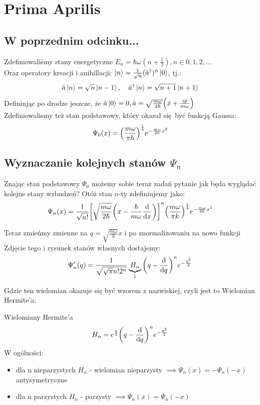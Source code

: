 \documentclass[12pt,a4paper]{report}
\newcommand{\subind}[2]{{\color{blue} #1\index{#2}}}
\newcommand{\com}[1]{{\color{red} #1}}
\newcommand{\phat}{\hat{p}}
\newenvironment{lecture}[1]{\par\medskip
   \noindent\chapter{#1} \rmfamily}{\medskip}
\newenvironment{emph_box}[1]
    {\begin{center}\color{BrickRed}
    \begin{tabular}{|p{0.9\textwidth}|}
    \hline
    \begin{center} \color{Dandelion}{\textbf{#1}} \end{center}
    \begin{center}
    }
    {
    \end{center}
    \\\\\hline
    \end{tabular} 
    \end{center}
    \color{black}
    }
\begin{document}
\begin{lecture}{Prima Aprilis}
\section{W poprzednim odcinku...}
Zdefiniowaliśmy stany energetyczne $E_n = \hbar \omega (n+\frac12), n \in {0, 1, 2, \dots}$\\
Oraz operatory kreacji i anihillacji: 
$\ket{n} = \frac{1}{\sqrt{n}} (\hat{a}^\dagger)^n \ket{0}$, tj.:
\[
    \hat{a} \ket{n} = \sqrt{n} \ket{n-1}\qc\hat{a}^\dagger \ket{n} = \sqrt{n+1} \ket{n+1}
\]
Definiując po drodze jeszcze, że $\hat{a}\ket{0} = 0, \hat{a} = \sqrt{\frac{m \omega}{2 \hbar}} \qty(\hat{x} + \frac{i \phat}{m \omega})$\\
Zdefiniowalismy też stan podstawowy, który okazał się być funkcją Gaussa:
\[
    \Psi_0(x) = \qty(\frac{m \omega}{\pi \hbar})^{\frac14} e^{-\frac{m \omega}{2 \hbar} x^2}
\]
\section{Wyznaczanie kolejnych stanów $\Psi_n$}
Znając stan podstawowy $\Psi_0$ możemy sobie teraz zadań pytanie jak będa wyglądać kolejne stany wzbudzeń? Otóż stan $n$-ty zdefiniujemy jako:
\[
    \Psi_n(x) = \frac{1}{\sqrt{n!}}\qty[\sqrt{\frac{m \omega}{2 \hbar}} \qty(x - \frac{\hbar}{m \omega} \dv{x})]^n \qty(\frac{m \omega}{\pi k})^{\frac14} e^{-\frac{m \omega}{2 \hbar} x^2}
\]

Teraz zmieńmy zmienne na $q = \sqrt{\frac{m \omega}{\hbar}}x$ i po znormalizowaniu na nowo funkcji \com{Zdjęcie tego i rysunek stanów własnych} dostajemy:
\begin{equation}
    \Psi_n'(q) = \frac{1}{\sqrt{\sqrt{\pi} n! 2^n}} \underbrace{H_n}_{\footnotemark} \qty(q - \dv{q})^n e^{-\frac{q^2}{2}}
    \label{eq:lec_10:stany_n}
\end{equation}
Gdzie ten wielomian okazuje się być wzorem z nazwiskiej, czyli jest to 
Wielomian Hermite'a:
\begin{emph_box}{\subind{Wielomiany Hermite'a}{Wielomiany!Hermite'a}}
    \begin{equation}
        H_n = e^{\frac{q}{2}} \qty(q - \dv{q})^n e^{-\frac{q^2}{2}}
        \label{eq:lec_10:wielomiany_hermita}
    \end{equation}
    W ogólności:
    \begin{itemize}
        \item dla n nieparzystych $H_n$ - wielomian nieparzysty $\implies \Psi_n(x) = -\Psi_n(-x)$ antysymetryczne
        \item dla n parzystych $H_n$ - parzysty $\implies \Psi_n(x) = \Psi_n(-x)$
    \end{itemize}
\end{emph_box}

\end{lecture}
\end{document}
